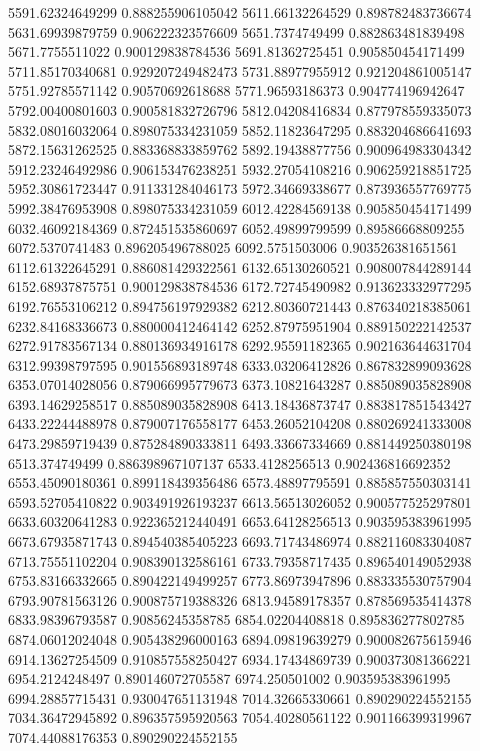 {5591.62324649299 0.888255906105042
5611.66132264529 0.898782483736674
5631.69939879759 0.906222323576609
5651.7374749499 0.882863481839498
5671.7755511022 0.900129838784536
5691.81362725451 0.905850454171499
5711.85170340681 0.929207249482473
5731.88977955912 0.921204861005147
5751.92785571142 0.90570692618688
5771.96593186373 0.904774196942647
5792.00400801603 0.900581832726796
5812.04208416834 0.877978559335073
5832.08016032064 0.898075334231059
5852.11823647295 0.883204686641693
5872.15631262525 0.883368833859762
5892.19438877756 0.900964983304342
5912.23246492986 0.906153476238251
5932.27054108216 0.906259218851725
5952.30861723447 0.911331284046173
5972.34669338677 0.873936557769775
5992.38476953908 0.898075334231059
6012.42284569138 0.905850454171499
6032.46092184369 0.872451535860697
6052.49899799599 0.89586668809255
6072.5370741483 0.896205496788025
6092.5751503006 0.903526381651561
6112.61322645291 0.886081429322561
6132.65130260521 0.908007844289144
6152.68937875751 0.900129838784536
6172.72745490982 0.913623332977295
6192.76553106212 0.894756197929382
6212.80360721443 0.876340218385061
6232.84168336673 0.880000412464142
6252.87975951904 0.889150222142537
6272.91783567134 0.880136934916178
6292.95591182365 0.902163644631704
6312.99398797595 0.901556893189748
6333.03206412826 0.867832899093628
6353.07014028056 0.879066995779673
6373.10821643287 0.885089035828908
6393.14629258517 0.885089035828908
6413.18436873747 0.883817851543427
6433.22244488978 0.879007176558177
6453.26052104208 0.880269241333008
6473.29859719439 0.875284890333811
6493.33667334669 0.881449250380198
6513.374749499 0.886398967107137
6533.4128256513 0.902436816692352
6553.45090180361 0.899118439356486
6573.48897795591 0.885857550303141
6593.52705410822 0.903491926193237
6613.56513026052 0.900577525297801
6633.60320641283 0.922365212440491
6653.64128256513 0.903595383961995
6673.67935871743 0.894540385405223
6693.71743486974 0.882116083304087
6713.75551102204 0.908390132586161
6733.79358717435 0.896540149052938
6753.83166332665 0.890422149499257
6773.86973947896 0.883335530757904
6793.90781563126 0.900875719388326
6813.94589178357 0.878569535414378
6833.98396793587 0.90856245358785
6854.02204408818 0.895836277802785
6874.06012024048 0.905438296000163
6894.09819639279 0.900082675615946
6914.13627254509 0.910857558250427
6934.17434869739 0.900373081366221
6954.2124248497 0.890146072705587
6974.250501002 0.903595383961995
6994.28857715431 0.930047651131948
7014.32665330661 0.890290224552155
7034.36472945892 0.896357595920563
7054.40280561122 0.901166399319967
7074.44088176353 0.890290224552155
}
